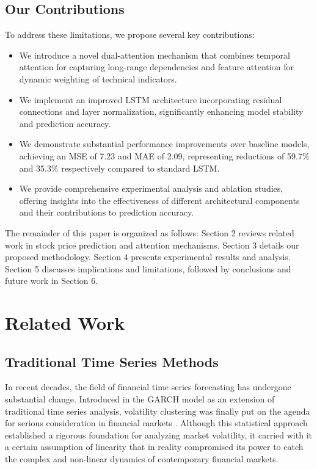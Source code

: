 \documentclass[10pt,twocolumn,letterpaper]{article}
\begin{document}
\subsection{Our Contributions}
To address these limitations, we propose several key contributions:
\begin{itemize}
	\item We introduce a novel dual-attention mechanism that combines temporal attention for capturing long-range dependencies and feature attention for dynamic weighting of technical indicators.
	\item We implement an improved LSTM architecture incorporating residual connections and layer normalization, significantly enhancing model stability and prediction accuracy.
	\item We demonstrate substantial performance improvements over baseline models, achieving an MSE of 7.23 and MAE of 2.09, representing reductions of 59.7\% and 35.3\% respectively compared to standard LSTM.
	\item We provide comprehensive experimental analysis and ablation studies, offering insights into the effectiveness of different architectural components and their contributions to prediction accuracy.
\end{itemize}

The remainder of this paper is organized as follows: Section 2 reviews related work in stock price prediction and attention mechanisms. Section 3 details our proposed methodology. Section 4 presents experimental results and analysis. Section 5 discusses implications and limitations, followed by conclusions and future work in Section 6.
\section{Related Work}
\subsection{Traditional Time Series Methods}
In recent decades, the field of financial time series forecasting has undergone substantial change. Introduced in the GARCH model as an extension of traditional time series analysis, volatility clustering was finally put on the agenda for serious consideration in financial markets \cite{bollerslev1986generalized}. Although this statistical approach established a rigorous foundation for analyzing market volatility, it carried with it a certain assumption of linearity that in reality compromised its power to catch the complex and non-linear dynamics of contemporary financial markets.
\end{document}
